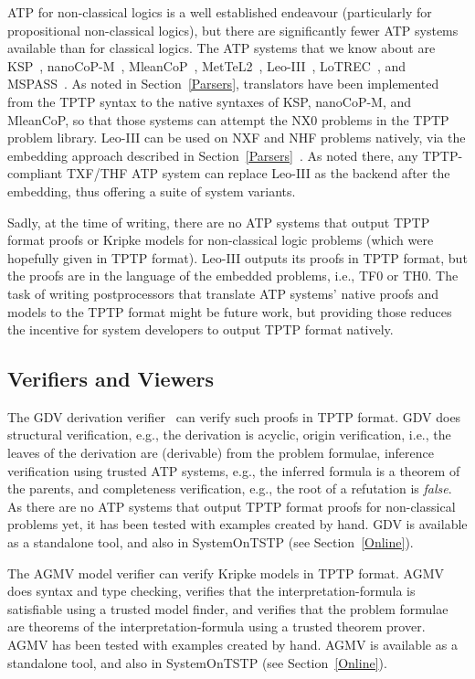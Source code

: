 \documentclass{ceurart}
\begin{document}
ATP for non-classical logics is a well established endeavour (particularly for propositional
non-classical logics), but there are significantly fewer ATP systems available than for classical 
logics.
The ATP systems that we know about are KSP~\cite{NHD20,PN+21}, nanoCoP-M~\cite{Ott21}, 
MleanCoP~\cite{Ott14}, MetTeL2~\cite{TSK12}, Leo-III~\cite{SB21}, LoTREC~\cite{FF+01}, and 
MSPASS~\cite{HS00-TABLEAUX}.
As noted in Section~\ref{Parsers}, translators have been implemented from the TPTP syntax to the 
native syntaxes of KSP, nanoCoP-M, and MleanCoP, so that those systems can attempt the NX0 
problems in the TPTP problem library.
Leo-III can be used on NXF and NHF problems natively, via the embedding approach described 
in Section~\ref{Parsers}~\cite{SS+23}.
As noted there, any TPTP-compliant TXF/THF ATP system can replace Leo-III as the backend after
the embedding, thus offering a suite of system variants.

Sadly, at the time of writing, there are no ATP systems that output TPTP format proofs or 
Kripke models for non-classical logic problems (which were hopefully given in TPTP format).
Leo-III outputs its proofs in TPTP format, but the proofs are in the language of the embedded 
problems, i.e., TF0 or TH0.
The task of writing postprocessors that translate ATP systems' native proofs and models to the
TPTP format might be future work, but providing those reduces the incentive for system developers
to output TPTP format natively.

\subsection{Verifiers and Viewers}
\label{Verifiers}

The GDV derivation verifier~\cite{Sut06} can verify such proofs in TPTP format.
GDV does structural verification, e.g., the derivation is acyclic, origin verification, i.e., 
the leaves of the derivation are (derivable) from the problem formulae, inference verification
using trusted ATP systems, e.g., the inferred formula is a theorem of the parents, and 
completeness verification, e.g., the root of a refutation is {\em false}.
As there are no ATP systems that output TPTP format proofs for non-classical problems yet, 
it has been tested with examples created by hand.
GDV is available as a standalone tool, and also in SystemOnTSTP (see Section~\ref{Online}).

The AGMV model verifier \cite{SS+23-LPAR} can verify Kripke models in TPTP format.
AGMV does syntax and type checking, verifies that the interpretation-formula is satisfiable
using a trusted model finder, and verifies that the problem formulae are theorems of the
interpretation-formula using a trusted theorem prover.
AGMV has been tested with examples created by hand.
AGMV is available as a standalone tool, and also in SystemOnTSTP (see Section~\ref{Online}).
\end{document}
